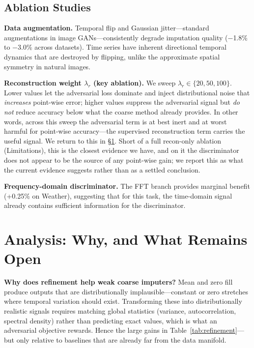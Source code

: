 \documentclass[sigconf,nonacm]{acmart}
\begin{document}
\subsection{Ablation Studies}

\textbf{Data augmentation.}
Temporal flip and Gaussian jitter---standard augmentations in image GANs---consistently degrade imputation quality ($-$1.8\% to $-$3.0\% across datasets). Time series have inherent directional temporal dynamics that are destroyed by flipping, unlike the approximate spatial symmetry in natural images.

\textbf{Reconstruction weight $\lambda_r$ (key ablation).}
We sweep $\lambda_r \in \{20, 50, 100\}$. Lower values let the adversarial loss dominate and inject distributional noise that \emph{increases} point-wise error; higher values suppress the adversarial signal but \emph{do not} reduce accuracy below what the coarse method already provides. In other words, across this sweep the adversarial term is at best inert and at worst harmful for point-wise accuracy---the supervised reconstruction term carries the useful signal. We return to this in \S\ref{sec:analysis}. Short of a full recon-only ablation (Limitations), this is the closest evidence we have, and on it the discriminator does not appear to be the source of any point-wise gain; we report this as what the current evidence suggests rather than as a settled conclusion.

\textbf{Frequency-domain discriminator.}
The FFT branch provides marginal benefit (+0.25\% on Weather), suggesting that for this task, the time-domain signal already contains sufficient information for the discriminator.

\section{Analysis: Why, and What Remains Open}
\label{sec:analysis}

\textbf{Why does refinement help weak coarse imputers?}
Mean and zero fill produce outputs that are distributionally implausible---constant or zero stretches where temporal variation should exist.
Transforming these into distributionally realistic signals requires matching global statistics (variance, autocorrelation, spectral density) rather than predicting exact values, which is what an adversarial objective rewards. Hence the large gains in Table~\ref{tab:refinement}---but only relative to baselines that are already far from the data manifold.
\end{document}
